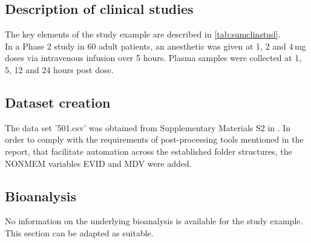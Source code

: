 \subsection{Description of clinical studies}

The key elements of the study example \autocite{Bauer2019} are described in \autoref{tab:sumclinstud}. \\
In a Phase 2 study in 60 adult patients, an anesthetic was given at 1, 2 and 4\,mg doses via intravenous infusion over 5 hours. Plasma samples were collected at 1, 5, 12 and 24 hours post dose.



\subsection{Dataset creation}

The data set '501.csv' was obtained from Supplementary Materials S2 in \autocite{Bauer2019}. In order to comply with the requirements of post-processing tools mentioned in the report, that facilitate automation across the established folder structures, the NONMEM variables \gls{EVID} and \gls{MDV} were added. 

\subsection{Bioanalysis}

No information on the underlying bioanalysis is available for the study example. This section can be adapted as suitable. 
